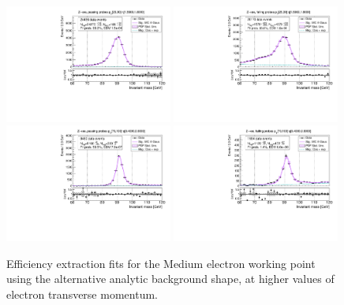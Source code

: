 \begin{figure}
\centering
\includegraphics[width=0.49\textwidth]{figures/Zee_RecoTemplate_BkgAnalytic_pass_ptBin3_etaBin23.pdf}
\includegraphics[width=0.49\textwidth]{figures/Zee_RecoTemplate_BkgAnalytic_fail_ptBin3_etaBin23.pdf}
\includegraphics[width=0.49\textwidth]{figures/Zee_RecoTemplate_BkgAnalytic_pass_ptBin14_etaBin17.pdf}
\includegraphics[width=0.49\textwidth]{figures/Zee_RecoTemplate_BkgAnalytic_fail_ptBin14_etaBin17.pdf}
\caption{Efficiency extraction fits for the Medium electron working point using the alternative analytic background shape, at higher values of electron transverse momentum.}
\label{fig:ZeeAltBkgFits2}
\end{figure}

